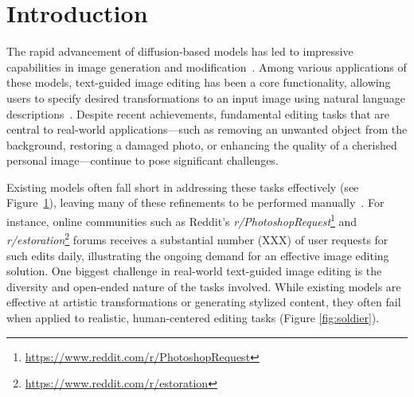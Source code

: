 \section{Introduction}
The rapid advancement of diffusion-based models has led to impressive capabilities in image generation and modification~\cite{Ramesh2022DALLE2, rombach2022high, brooks2023instructpix2pix, zhang2024magicbrush}.
Among various applications of these models, text-guided image editing has been a core functionality, allowing users to specify desired transformations to an input image using natural language descriptions~\cite{brooks2023instructpix2pix, zhang2024magicbrush}.
Despite recent achievements, fundamental editing tasks that are central to real-world applications---such as removing an unwanted object from the background, restoring a damaged photo, or enhancing the quality of a cherished personal image---continue to pose significant challenges.





Existing models often fall short in addressing these tasks effectively (see Figure~\ref{}), leaving many of these refinements to be performed manually~\cite{}.
For instance, online communities such as Reddit’s \textit{r/PhotoshopRequest}\footnote{\url{https://www.reddit.com/r/PhotoshopRequest}} and \textit{r/estoration}\footnote{\url{https://www.reddit.com/r/estoration}} forums receives a substantial number (XXX) of user requests for such edits daily, illustrating the ongoing demand for an effective image editing solution.
One biggest challenge in real-world text-guided image editing is the diversity and open-ended nature of the tasks involved.
While existing models are effective at artistic transformations or generating stylized content, they often fail when applied to realistic, human-centered editing tasks (Figure \ref{fig:soldier}).

